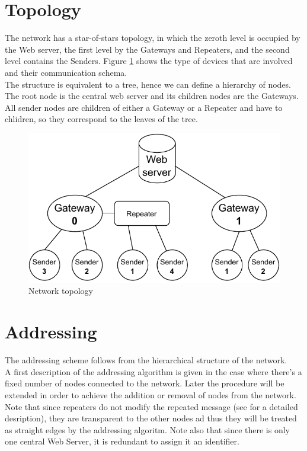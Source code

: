 \section{Topology}
The network has a star-of-stars topology, in which the zeroth level is occupied by the Web server, the first level by the
Gateways and Repeaters, and the second level contains the Senders.
Figure \ref{network topology img} shows the type of devices that are involved and their communication schema. \\
The structure is equivalent to a tree, hence we can define a hierarchy of nodes. The root node is the central web server
and its children nodes are the Gateways. All sender nodes are children of either a Gateway or a Repeater and have to
chlidren, so they correspond to the leaves of the tree.

\begin{figure}[ht]
    \centering
    \includegraphics[width=350pt]{uml/network_topology.pdf}
    \caption{Network topology}
    \label{network topology img}
\end{figure}

\section{Addressing}
The addressing scheme follows from the hierarchical structure of the network.\\
A first description of the addressing algorithm is given in the case where there's a fixed number of nodes connected to the
network. Later the procedure will be extended in order to achieve the addition or removal of nodes from the network.
Note that since repeaters do not modify the repeated message (see \cite{DESCRIZIONE DEI RIPETITORI} for a detailed
desription), they are transparent to the other nodes ad thus they will be treated as straight edges by the addressing
algoritm. Note also that since there is only one central Web Server, it is redundant to assign it an identifier.


